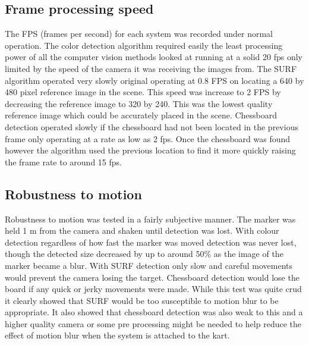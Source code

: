 \subsection{Frame processing speed}
The FPS (frames per second) for each system was recorded under normal operation. The color detection algorithm required easily the least processing power of all the computer vision methods looked at running at a solid 20 fps only limited by the speed of the camera it was receiving the images from. The SURF algorithm operated very slowly original operating at 0.8 FPS on locating a 640 by 480 pixel reference image in the scene. This speed was increase to 2 FPS by decreasing the reference image to 320 by 240. This was the lowest quality reference image which could be accurately placed in the scene. Chessboard detection operated slowly if the chessboard had not been located in the previous frame only operating at a rate as low as 2 fps. Once the chessboard was found however the algorithm used the previous location to find it more quickly raising the frame rate to around 15 fps.

\subsection{Robustness to motion}
Robustness to motion was tested in a fairly subjective manner. The marker was held 1 m from the camera and shaken until detection was lost. With colour detection regardless of how fast the marker was moved detection was never lost, though the detected size decreased by up to around 50\% as the image of the marker became a blur. With SURF detection only slow and careful movements would prevent the camera losing the target. Chessboard detection would lose the board if any quick or jerky movements were made. While this test was quite crud it clearly showed that SURF would be too susceptible to motion blur to be appropriate. It also showed that chessboard detection was also weak to this and a higher quality camera or some pre processing might be needed to help reduce the effect of motion blur when the system is attached to the kart.

